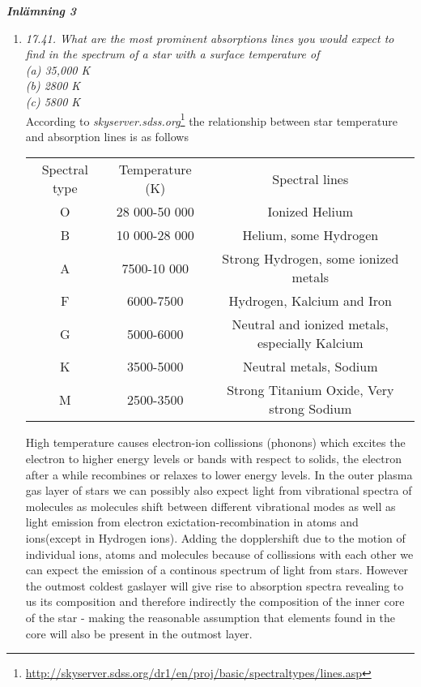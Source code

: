 \documentclass[./exercises.tex]{subfiles}
\begin{document}
\textit{\textbf{Inlämning 3  } }
\begin{enumerate}

\item \textit{17.41. What are the most prominent absorptions lines you would expect to find in the 
spectrum of a star with a surface temperature of}\\ 
\textit{(a) 35,000 K}\\
\textit{(b) 2800 K }\\
\textit{(c) 5800 K }\\

According to \textit{skyserver.sdss.org}\footnote{\url{http://skyserver.sdss.org/dr1/en/proj/basic/spectraltypes/lines.asp}}
the relationship between star temperature and absorption lines is as follows
\begin{center}
\begin{tabular}{ |c|c|c| } 
 \hline
Spectral type      &Temperature (K)   	& Spectral lines     	\\ 
O                  &28 000-50 000       &Ionized Helium \\
B                  &10 000-28 000       &Helium, some Hydrogen\\
A                  &7500-10 000         &Strong Hydrogen, some ionized metals\\
F                  &6000-7500           &Hydrogen, Kalcium and Iron\\
G                  &5000-6000           &Neutral and ionized metals, especially Kalcium\\
K                  &3500-5000           &Neutral metals, Sodium\\
M                  &2500-3500           &Strong Titanium Oxide, Very strong Sodium\\
 \hline
\end{tabular}
\end{center}

High temperature causes electron-ion collissions (phonons) which excites the electron
to higher energy levels or bands with respect to solids, the electron after a while recombines
or relaxes to lower energy levels.
In the outer plasma gas layer of stars we can possibly
also expect light from vibrational spectra of molecules as molecules shift between different vibrational modes
 as well as light emission from electron exictation-recombination in atoms and ions(except in Hydrogen ions).
Adding the dopplershift due to the motion of individual ions, atoms and molecules because of collissions with each other
we can expect the emission of a continous spectrum of light from stars.
However the outmost coldest gaslayer will give rise to absorption spectra revealing to us its composition
and therefore indirectly the composition of the inner core of the star - making the reasonable
assumption that elements found in the core will also be present in the outmost layer.


\end{enumerate}
\end{document}
